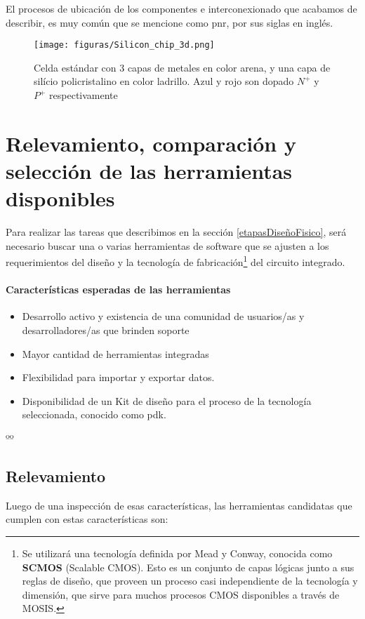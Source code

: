 El procesos de ubicación de los componentes e interconexionado que acabamos de describir, es muy común que se mencione como \gls{pnr}, por sus siglas en inglés.



\begin{figure}[h]
\centering
\texttt{[image: figuras/Silicon\_chip\_3d.png]}
  \caption{Celda estándar con 3 capas de metales en color arena, y una capa de silício policristalino en color ladrillo. Azul y rojo son dopado $N^+$ y $P^+$ respectivamente}
  \label{fig:routing}
\end{figure}

\section{Relevamiento, comparación y selección de las herramientas disponibles}
Para realizar las tareas que describimos en la sección \ref{etapasDiseñoFisico}, será necesario buscar una o varias herramientas de software que se ajusten a los requerimientos del diseño y la tecnología de fabricación\footnote{Se utilizará una tecnología definida por Mead y Conway\cite{mead-conway80}, conocida como  \textbf{SCMOS} (Scalable CMOS).
Esto es un conjunto de capas lógicas junto a sus reglas de diseño, que proveen un proceso casi independiente de la tecnología y dimensión, que sirve para muchos procesos CMOS disponibles a través de MOSIS.} del circuito integrado.

\paragraph{Características esperadas de las herramientas}
\begin{itemize}
\item Desarrollo activo y existencia de una comunidad de usuarios/as y desarrolladores/as que brinden soporte
\item Mayor cantidad de herramientas integradas
\item Flexibilidad para importar y exportar datos. 
\item Disponibilidad de un Kit de diseño para el proceso de la tecnología seleccionada, conocido como \gls{pdk}.
\end{itemize}	ºº

\subsection{Relevamiento}
Luego de una inspección de esas características, las herramientas candidatas que cumplen con estas características son:

